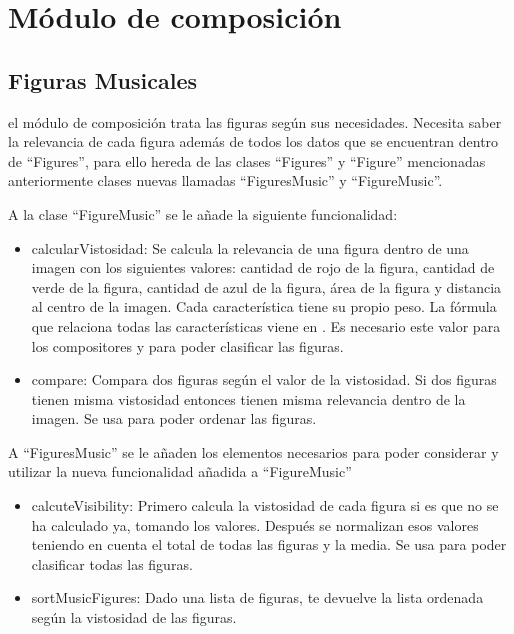 \section{Módulo de composición}


\subsection{Figuras Musicales}

el módulo de composición trata las figuras según sus necesidades. Necesita saber la relevancia de cada figura además de todos los datos que se encuentran dentro de ``Figures'', para ello hereda de las clases ``Figures'' y ``Figure'' mencionadas anteriormente  clases nuevas llamadas ``FiguresMusic'' y ``FigureMusic''.


A la clase ``FigureMusic'' se le añade la siguiente funcionalidad:
\begin{itemize}
\item{calcularVistosidad}: Se calcula la relevancia de una figura dentro de una imagen con los siguientes valores: cantidad de rojo de la figura, cantidad de verde de la figura, cantidad de azul de la figura, área de la figura y distancia al centro de la imagen. Cada característica tiene su propio peso. La fórmula que relaciona todas las características viene en . Es necesario este valor para los compositores y para poder clasificar las figuras.
\item{compare}: Compara dos figuras según el valor de la vistosidad. Si dos figuras tienen misma vistosidad entonces tienen misma relevancia dentro de la imagen. Se usa para poder ordenar las figuras.
\end{itemize}

A ``FiguresMusic'' se le añaden los elementos necesarios para poder considerar y utilizar la nueva funcionalidad añadida a ``FigureMusic''
\begin{itemize}
\item{calcuteVisibility}: Primero calcula la vistosidad de cada figura si es que no se ha calculado ya, tomando los valores. Después se normalizan esos valores teniendo en cuenta el total de todas las figuras y la media. Se usa para poder clasificar todas las figuras.
\item{sortMusicFigures}: Dado una lista de figuras, te devuelve la lista ordenada según la vistosidad de las figuras.
\end{itemize}